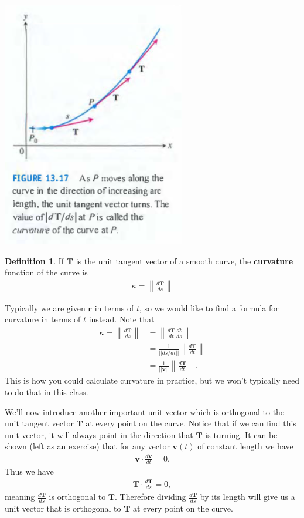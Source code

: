 \documentclass[12pt, letter]{article}
\newcommand{\norm}[1]{\left\lVert#1\right\rVert}
\theoremstyle{plain}
\numberwithin{theorem}{section}
\theoremstyle{definition}
\newtheorem{definition}[theorem]{Definition}
\begin{document}
\begin{center}
\includegraphics[scale=0.7]{m1_f30}
\end{center}

\bigskip

\begin{definition}
If $\bm{T}$ is the unit tangent vector of a smooth curve, the \textbf{curvature} function of the curve is
\begin{align*}
\kappa = \norm{\frac{d\bm{T}}{ds}}
\end{align*}
\end{definition}

\bigskip

Typically we are given $\bm{r}$ in terms of $t$, so we would like to find a formula for curvature in terms of $t$ instead. Note that
\begin{align*}
\kappa = \norm{\frac{d\bm{T}}{ds}} &= \norm{\frac{d\bm{T}}{dt} \frac{dt}{ds}}\\
&= \frac{1}{||ds/dt||} \norm{\frac{d\bm{T}}{dt}}\\
&= \frac{1}{||\bm{v}||}\norm{\frac{d\bm{T}}{dt}}.
\end{align*}
This is how you could calculate curvature in practice, but we won't typically need to do that in this class.

\bigskip

\hrulefill

\bigskip

We'll now introduce another important unit vector which is orthogonal to the unit tangent vector $\bm{T}$ at every point on the curve. Notice that if we can find this unit vector, it will always point in the direction that $\bm{T}$ is turning. It can be shown (left as an exercise) that for any vector $\bm{v}(t)$ of constant length we have
\begin{align*}
\bm{v} \cdot \frac{d\bm{v}}{dt} = 0.
\end{align*}
Thus we have
\begin{align*}
\bm{T} \cdot \frac{d\bm{T}}{ds} = 0,
\end{align*}
meaning $\frac{d\bm{T}}{ds}$ is orthogonal to $\bm{T}$. Therefore dividing $\frac{d\bm{T}}{ds}$ by its length will give us a unit vector that is orthogonal to $\bm{T}$ at every point on the curve.
\end{document}
